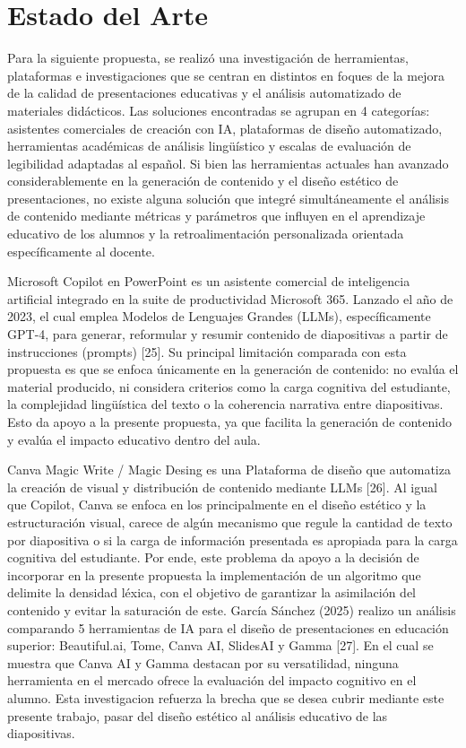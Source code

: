 \documentclass[11pt]{article}
\begin{document}
\newpage
\section*{Estado del Arte}
Para la siguiente propuesta, se realizó una investigación de herramientas, plataformas e investigaciones que se centran en distintos en foques de la mejora de la calidad de presentaciones educativas y el análisis automatizado de materiales didácticos. Las soluciones encontradas se agrupan en 4 categorías: asistentes comerciales de creación con IA, plataformas de diseño automatizado, herramientas académicas de análisis lingüístico y escalas de evaluación de legibilidad adaptadas al español. Si bien las herramientas actuales han avanzado considerablemente en la generación de contenido y el diseño estético de presentaciones, no existe alguna solución que integré simultáneamente el análisis de contenido mediante métricas y parámetros que influyen en el aprendizaje educativo de los alumnos y la retroalimentación personalizada orientada específicamente al docente.

Microsoft Copilot en PowerPoint es un asistente comercial de inteligencia artificial integrado en la suite de productividad Microsoft 365. Lanzado el año de 2023, el cual emplea Modelos de Lenguajes Grandes (LLMs), específicamente GPT-4, para generar, reformular y resumir contenido de diapositivas a partir de instrucciones (prompts) [25]. Su principal limitación comparada con esta propuesta es que se enfoca únicamente en la generación de contenido: no evalúa el material producido, ni considera criterios como la carga cognitiva del estudiante, la complejidad lingüística del texto o la coherencia narrativa entre diapositivas. Esto da apoyo a la presente propuesta, ya que facilita la generación de contenido y evalúa el impacto educativo dentro del aula.

Canva Magic Write / Magic Desing es una Plataforma de diseño que automatiza la creación de visual y distribución de contenido mediante LLMs [26]. Al igual que Copilot, Canva se enfoca en los principalmente en el diseño estético y la estructuración visual, carece de algún mecanismo que regule la cantidad de texto por diapositiva o si la carga de información presentada es apropiada para la carga cognitiva del estudiante. Por ende, este problema da apoyo a la decisión de incorporar en la presente propuesta la implementación de un algoritmo que delimite la densidad léxica, con el objetivo de garantizar la asimilación del contenido y evitar la saturación de este.
García Sánchez (2025) realizo un análisis comparando 5 herramientas de IA para el diseño de presentaciones en educación superior: Beautiful.ai, Tome, Canva AI, SlidesAI y Gamma [27]. En el cual se muestra que Canva AI y Gamma destacan por su versatilidad, ninguna herramienta en el mercado ofrece la evaluación del impacto cognitivo en el alumno. Esta investigacion refuerza la brecha que se desea cubrir mediante este presente trabajo, pasar del diseño estético al análisis educativo de las diapositivas.
\end{document}
